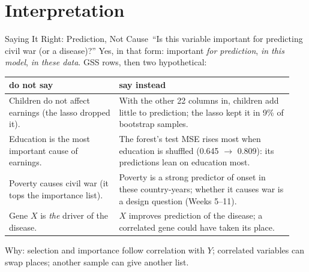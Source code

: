 \documentclass[aspectratio=169,11pt,xcolor=dvipsnames]{beamer}
\newcommand{\core}{\,\raisebox{0.6pt}{\textcolor{corestar}{$\bigstar$}}}
\begin{document}
\section[Interpretation]{Interpretation}
\begin{frame}\sectionpage\end{frame}

\begin{frame}{Saying It Right: Prediction, Not Cause\core}
``Is this variable important for predicting civil war (or a disease)?'' \alert{Yes, in that form}:
important \emph{for prediction}, \emph{in this model}, \emph{in these data}. GSS rows, then two hypothetical:
\begin{center}\footnotesize
\renewcommand{\arraystretch}{1.05}
\begin{tabular}{@{}>{\raggedright\arraybackslash}p{0.36\linewidth}>{\raggedright\arraybackslash}p{0.58\linewidth}@{}}
\toprule
\textbf{do not say} & \textbf{say instead} \\
\midrule
Children do not affect earnings (the lasso dropped it). &
With the other 22 columns in, children add little to prediction; the lasso kept it in 9\% of bootstrap samples. \\
Education is the most important cause of earnings. &
The forest's test MSE rises most when education is shuffled (0.645 $\to$ 0.809): its predictions lean on education most. \\
Poverty causes civil war (it tops the importance list). &
Poverty is a strong predictor of onset in these country-years; whether it causes war is a design question (Weeks 5--11). \\
Gene $X$ is \emph{the} driver of the disease. &
$X$ improves prediction of the disease; a correlated gene could have taken its place. \\
\bottomrule
\end{tabular}
\end{center}
\vskip2pt
{\small Why: selection and importance follow correlation with $Y$; correlated variables can swap places;
another sample can give another list.}
\end{frame}
\end{document}
